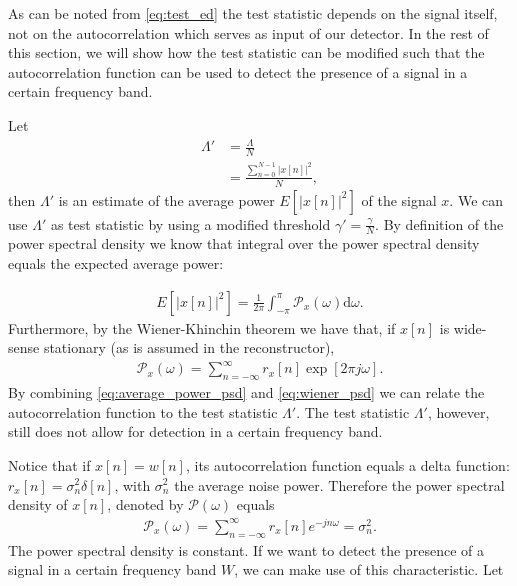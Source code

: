 \documentclass[a4paper, openany, oneside]{memoir}
\begin{document}

As can be noted from \cref{eq:test_ed} the test statistic depends on the signal itself, not on the autocorrelation which serves as input of our detector.
In the rest of this section, we will show how the test statistic can be modified
such that the autocorrelation function can be used to detect the presence of  a signal in a certain frequency band.

Let 
\begin{align*}
\Lambda' &= \frac{\Lambda}{N}\\
	&= \frac{\sum_{n=0}^{N-1} |x[n]|^2}{N},
\end{align*}
then $\Lambda'$ is an estimate of the average power $E\left[|x[n]|^2\right]$ of the signal $x$. We can use $\Lambda'$ as test statistic by using a modified threshold $\gamma' = \frac{\gamma}{N}$. By definition of the power spectral density we know that integral over the power spectral density equals the expected average power:

\begin{align}\label{eq:average_power_psd}
E\left[\left|x[n]\right|^2\right] = \frac{1}{2\pi} \int_{-\pi}^{\pi}\mathcal{P}_x(\omega) \text{d}\omega.
\end{align}
Furthermore, by the Wiener-Khinchin theorem we have that, if $x[n]$ is wide-sense stationary (as is assumed in the reconstructor),
\begin{align}\label{eq:wiener_psd}
	\mathcal{P}_x(\omega) = \sum_{n=-\infty}^{\infty} r_x[n] \exp [2\pi j\omega].
\end{align}
By combining \cref{eq:average_power_psd} and \cref{eq:wiener_psd} we can relate the autocorrelation function to the test statistic $\Lambda'$.
The test statistic $\Lambda'$, however, still does not allow for detection in a certain frequency band.

 Notice that if $x[n]=w[n]$, its autocorrelation function equals a delta function: $r_x[n] = \sigma_n^2\delta[n]$, with $\sigma_n^2$ the average noise power. 
 Therefore the power spectral density of $x[n]$, denoted by $\mathcal{P}(\omega)$ equals  
 \begin{align*}
 \mathcal{P}_x(\omega) = \sum_{n=-\infty}^{\infty}r_x[n]e^{-jn\omega} = \sigma_n^2.
 \end{align*} The power spectral density is constant. If we want to detect the presence of a signal in a certain frequency band $W$, we can make use of this characteristic. Let
\end{document}
